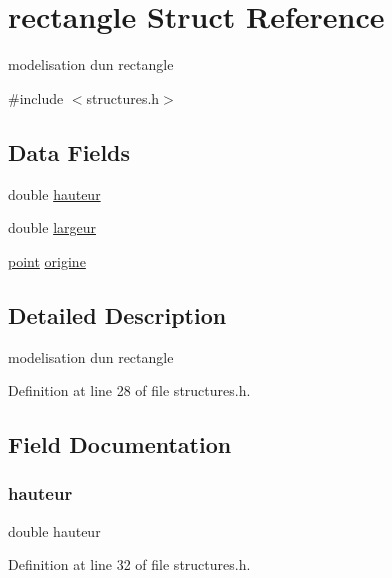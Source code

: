 \hypertarget{structrectangle}{}\section{rectangle Struct Reference}
\label{structrectangle}


modelisation d\textquotesingle{}un rectangle  




{\ttfamily \#include $<$structures.\+h$>$}

\subsection*{Data Fields}
\begin{DoxyCompactItemize}
\item 
double \hyperlink{structrectangle_a5c78841de595a397137879dbd09d81ca}{hauteur}
\item 
double \hyperlink{structrectangle_a27d184f505abbc0cef895c725b2be27d}{largeur}
\item 
\hyperlink{structpoint}{point} \hyperlink{structrectangle_a52a08a00d432ad1428716bbc5659e634}{origine}
\end{DoxyCompactItemize}


\subsection{Detailed Description}
modelisation d\textquotesingle{}un rectangle 

Definition at line 28 of file structures.\+h.



\subsection{Field Documentation}
\hypertarget{structrectangle_a5c78841de595a397137879dbd09d81ca}{}\label{structrectangle_a5c78841de595a397137879dbd09d81ca} 
\subsubsection{\texorpdfstring{hauteur}{hauteur}}
{\footnotesize\ttfamily double hauteur}



Definition at line 32 of file structures.\+h.

\hypertarget{structrectangle_a27d184f505abbc0cef895c725b2be27d}{}\label{structrectangle_a27d184f505abbc0cef895c725b2be27d} 
